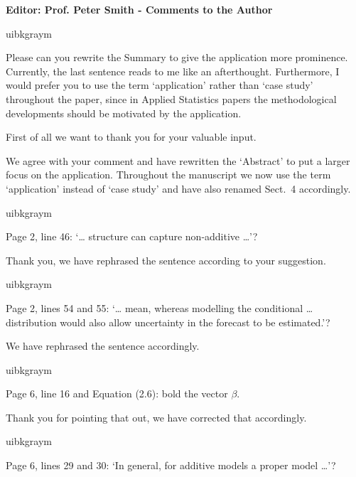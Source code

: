 \documentclass[english, noconfig]{uibklttr}
\newcommand{\section}[1]{{\Large{\textbf{#1}}}}
\newenvironment{re}{
    \begin{color}{uibkgraym}
        \itshape
}{
    \end{color}
}
\begin{document}
\newpage

\section{Editor: Prof. Peter Smith - Comments to the Author}

\begin{re}
Please can you rewrite the Summary to give the application more prominence.
Currently, the last sentence reads to me like an afterthought. Furthermore, I
would prefer you to use the term `application' rather than `case study'
throughout the paper, since in Applied Statistics papers the methodological
developments should be motivated by the application.
\end{re}

\vspace{-1em}
First of all we want to thank you for your valuable input. 

We agree with your comment and have rewritten the `Abstract' to put a larger
focus on the application. Throughout the manuscript we now use the term
`application' instead of `case study' and have also renamed Sect.~4
accordingly.

\vspace{0.5em}
\begin{re}
Page 2, line 46: `… structure can capture non-additive …'?
\end{re}

Thank you, we have rephrased the sentence according to your suggestion.

\vspace{0.5em}
\begin{re}
Page 2, lines 54 and 55: `… mean, whereas modelling the conditional …
distribution would also allow uncertainty in the forecast to be estimated.'?
\end{re}

We have rephrased the sentence accordingly.

\vspace{0.5em}
\begin{re}
Page 6, line 16 and Equation (2.6): bold the vector $\beta$.
\end{re}

Thank you for pointing that out, we have corrected that accordingly.

\vspace{0.5em}
\begin{re}
Page 6, lines 29 and 30: `In general, for additive models a proper model …'?
\end{re}
\end{document}
